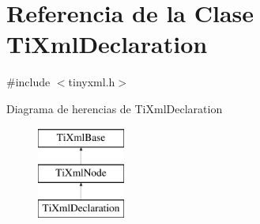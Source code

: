 \hypertarget{classTiXmlDeclaration}{\section{\-Referencia de la \-Clase \-Ti\-Xml\-Declaration}
\label{classTiXmlDeclaration}
}


{\ttfamily \#include $<$tinyxml.\-h$>$}

\-Diagrama de herencias de \-Ti\-Xml\-Declaration\begin{figure}[H]
\begin{center}
\leavevmode
\includegraphics[height=3.000000cm]{classTiXmlDeclaration}
\end{center}
\end{figure}
